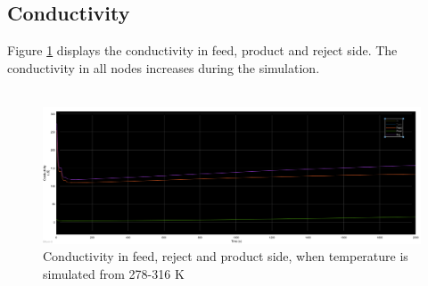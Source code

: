 \subsection{Conductivity}
Figure \ref{fig:conden} displays the conductivity in feed, product and reject side. The conductivity in all nodes increases during the simulation. \\
\\
\begin{figure}[H]
  \label{fig:conden}
  \includegraphics[width=1.1\linewidth]{cond.PNG}
  \caption{Conductivity in feed, reject and product side, when temperature is simulated from 278-316 K}
\end{figure}
\newpage


